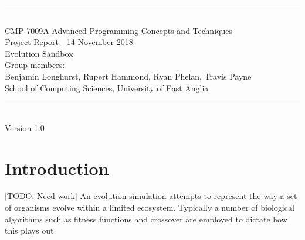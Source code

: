 \documentclass[a4paper, oneside, 11pt]{report}
\begin{document}
\begin{titlepage}
\begin{center}
\rule{12cm}{1mm} \\
\vspace{1cm}
{\large  CMP-7009A Advanced Programming Concepts and Techniques}
\vspace{7.5cm}
\\{\Large Project Report - 14 November 2018}
\vspace{1.5cm}
\\{\LARGE Evolution Sandbox}
\vspace{1.0cm}
\\{\Large Group members: \\ Benjamin Longhurst, Rupert Hammond, Ryan Phelan, Travis Payne}
\vspace{10.0cm}
\\{\large School of Computing Sciences, University of East Anglia}
\\ \rule{12cm}{0.5mm}
\\ \hspace{8.5cm} {\large Version 1.0}
\end{center}
\end{titlepage}

\setcounter{page}{1}

\begin{abstract}
	An abstract is a brief summary (maximum 250 words) of your entire project. It should cover your objectives, your methodology used, how you implemented the methodology for your specific results and what your final results are, your final outcome or deliverable and conclusion. You do not cover literature reviews or background in an abstract nor should you use abbreviations or acronyms. In the remainder of the report the chapter titles are suggestions and can be changed (or you can add more chapters if you wish to do so). This template is designed to help you write a clear report but you are welcome to modify it (at your peril ...). Finally, a guideline in size is approximately 3,500 words (not including abstract, captions and references) but no real limit on figures, tables, etc.
\end{abstract}

\chapter{Introduction}
[TODO: Need work]
An evolution simulation attempts to represent the way a set of organisms evolve within a limited ecosystem. Typically a number of biological algorithms such as fitness functions and crossover are employed to dictate how this plays out. 
\end{document}
